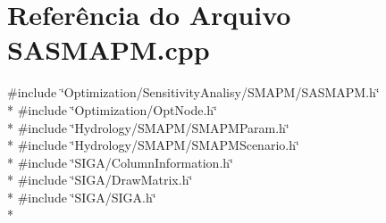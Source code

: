 \section{Referência do Arquivo S\+A\+S\+M\+A\+P\+M.\+cpp}
\label{_s_a_s_m_a_p_m_8cpp}
{\ttfamily \#include \char`\"{}Optimization/\+Sensitivity\+Analisy/\+S\+M\+A\+P\+M/\+S\+A\+S\+M\+A\+P\+M.\+h\char`\"{}}\\*
{\ttfamily \#include \char`\"{}Optimization/\+Opt\+Node.\+h\char`\"{}}\\*
{\ttfamily \#include \char`\"{}Hydrology/\+S\+M\+A\+P\+M/\+S\+M\+A\+P\+M\+Param.\+h\char`\"{}}\\*
{\ttfamily \#include \char`\"{}Hydrology/\+S\+M\+A\+P\+M/\+S\+M\+A\+P\+M\+Scenario.\+h\char`\"{}}\\*
{\ttfamily \#include \char`\"{}S\+I\+G\+A/\+Column\+Information.\+h\char`\"{}}\\*
{\ttfamily \#include \char`\"{}S\+I\+G\+A/\+Draw\+Matrix.\+h\char`\"{}}\\*
{\ttfamily \#include \char`\"{}S\+I\+G\+A/\+S\+I\+G\+A.\+h\char`\"{}}\\*
